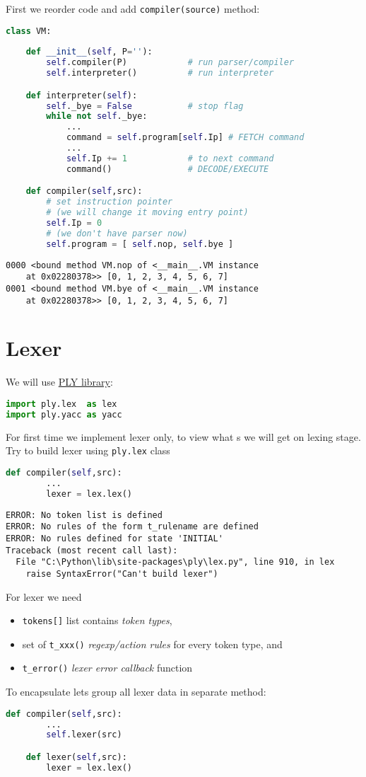 First we reorder code and add \verb|compiler(source)| method:
\begin{lstlisting}[language=python]
class VM:
	
	def __init__(self, P=''):
		self.compiler(P)			# run parser/compiler
		self.interpreter()          # run interpreter

	def interpreter(self):
		self._bye = False           # stop flag
		while not self._bye:
			...
			command = self.program[self.Ip] # FETCH command
			...
			self.Ip += 1            # to next command
			command()               # DECODE/EXECUTE

	def compiler(self,src):
		# set instruction pointer
		# (we will change it moving entry point)
		self.Ip = 0							
		# (we don't have parser now)	
		self.program = [ self.nop, self.bye ]
\end{lstlisting}
\begin{lstlisting}
0000 <bound method VM.nop of <__main__.VM instance
	at 0x02280378>> [0, 1, 2, 3, 4, 5, 6, 7]
0001 <bound method VM.bye of <__main__.VM instance
	at 0x02280378>> [0, 1, 2, 3, 4, 5, 6, 7]
\end{lstlisting}

\section{Lexer}

We will use \href{http://www.dabeaz.com/ply/}{PLY library}:
\begin{lstlisting}[language=python]
import ply.lex  as lex
import ply.yacc as yacc
\end{lstlisting}

For first time we implement lexer only, to view what s we will get
on lexing stage. Try to build lexer using \verb|ply.lex| class
\begin{lstlisting}[language=python]
	def compiler(self,src):
		...
		lexer = lex.lex()
\end{lstlisting}
\begin{lstlisting}
ERROR: No token list is defined
ERROR: No rules of the form t_rulename are defined
ERROR: No rules defined for state 'INITIAL'
Traceback (most recent call last):
  File "C:\Python\lib\site-packages\ply\lex.py", line 910, in lex
    raise SyntaxError("Can't build lexer")
\end{lstlisting}

For lexer we need 
\begin{itemize}
  \item \verb|tokens[]| list contains \emph{token types}, 
  \item set of \verb|t_xxx()| \emph{regexp/action rules} for every token type,
  and
  \item \verb|t_error()| \emph{lexer error callback} function 
\end{itemize}
To encapsulate lets group all lexer data in separate method:
\begin{lstlisting}[language=python]
	def compiler(self,src):
		...
		self.lexer(src)

	def lexer(self,src):
		lexer = lex.lex()
\end{lstlisting}

